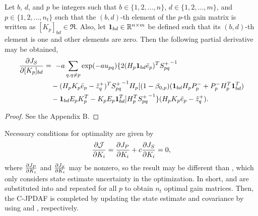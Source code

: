 \begin{prop}
Let $b$, $d$, and $p$ be integers such that $b\in\{1,2,...,n\}$,  $d\in\{1,2,...,m\}$, and $p\in\{1,2,...,n_t\}$ such that the $(b,d)$-th element of the $p$-th gain matrix is written as $[K_p]_{bd}\in\Re$.
Also, let $\mathbf{1}_{bd}\in \mathbb{R}^{n\times m}$ be defined such that its $(b,d)$-th element is one and other elements are zero.
Then the following partial derivative may be obtained,
\begin{align*}
\frac{\partial J_S}{\partial [K_p]_{bd}}&=\ -a\sum\limits_{q,q\neq p}\exp (-au_{pq})
\{
2(H_p\mathbf{1}_{bd}{\bar{e}}_p)^T
{S_{pq}^+}^{-1}
\nonumber
\\
& \quad
-(H_pK_p{\bar{e}}_p-\hat z^+_{q})^T
{S^+_{pq}}^{-1}
H_p
[(1-\beta_{0,p})(\mathbf{1}_{bd} H_pP_p^-
+P_p^-H_p^T\mathbf{1}_{bd}^T)
\nonumber
\\
& \quad
-\mathbf{1}_{bd} E_pK_p^T-K_pE_p\mathbf{1}_{bd}^T]
H_p^T
{S^+_{pq}}^{-1}
\}(H_pK_p{\bar{e}}_p-\hat z^+_{q}).
\end{align*}
\end{prop}
\begin{proof}
See the Appendix B.
\end{proof}


Necessary conditions for optimality are given by
\begin{align}
\frac{\partial \mathcal{J}}{\partial K_i} = \frac{\partial J_P}{\partial K_i} + c \frac{\partial J_S}{\partial K_i} =0,\label{eqn:NCO}
\end{align}
where $\frac{\partial J_P}{\partial K_i}$ and $\frac{\partial J_S}{\partial K_i}$ may be nonzero, so the result may be different than , which only considers state estimate uncertainty in the optimization.
In short,  and  are substituted into  and repeated for all $p$ to obtain $n_t$ optimal gain matrices.
Then, the C-JPDAF is completed by updating the state estimate and covariance by using  and , respectively.


